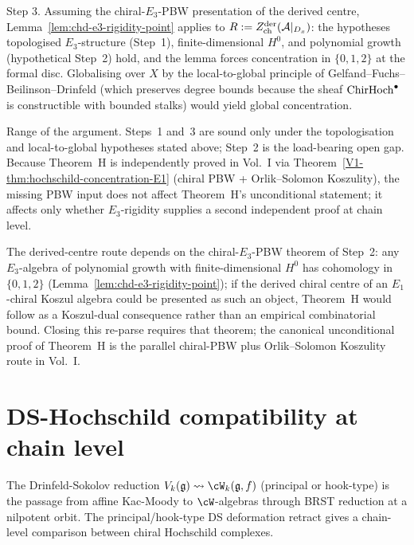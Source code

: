 \begin{remark}
Step 3. Assuming the chiral-$E_3$-PBW presentation of the derived centre,
Lemma~\ref{lem:chd-e3-rigidity-point} applies to
$R := Z^{\mathrm{der}}_{\mathrm{ch}}(\mathcal{A}|_{D_x})$: the hypotheses
topologised $E_3$-structure (Step~1), finite-dimensional $H^0$, and
polynomial growth (hypothetical Step~2) hold, and the lemma forces
concentration in $\{0,1,2\}$ at the formal disc. Globalising over $X$
by the local-to-global principle of
Gelfand--Fuchs--Beilinson--Drinfeld (which preserves degree bounds
because the sheaf $\mathrm{ChirHoch}^\bullet$ is constructible with bounded
stalks) would yield global concentration.

Range of the argument. Steps~1 and~3 are sound only under the
topologisation and local-to-global hypotheses stated above; Step~2 is
the load-bearing open gap. Because Theorem~H
is independently proved in Vol.~I via
Theorem~\ref*{V1-thm:hochschild-concentration-E1} (chiral PBW +
Orlik--Solomon Koszulity), the missing PBW input does not
affect Theorem~H's unconditional statement; it affects only whether
$E_3$-rigidity supplies a second independent proof at chain level.
\end{remark}

\begin{remark}%
\label{rem:chd-consequence-not-hypothesis}%
%
The derived-centre route depends on the chiral-$E_3$-PBW theorem
of Step~2: any $E_3$-algebra of polynomial growth with finite-dimensional
$H^0$ has cohomology in $\{0,1,2\}$
(Lemma~\ref{lem:chd-e3-rigidity-point}); if the derived chiral centre
of an $E_1$-chiral Koszul algebra could be presented as such an object,
Theorem~H would follow as a Koszul-dual consequence rather than an
empirical combinatorial bound. Closing this re-parse requires that
theorem; the canonical unconditional proof of Theorem~H is
the parallel chiral-PBW plus Orlik--Solomon Koszulity route in
Vol.~I.
\end{remark}

\section{DS-Hochschild compatibility at chain level}
\label{sec:chd-ds}

The Drinfeld-Sokolov reduction $V_k(\fg) \rightsquigarrow \cW_k(\fg, f)$
(principal or hook-type) is the passage from affine Kac-Moody to
$\cW$-algebras through BRST reduction at a nilpotent orbit. The
principal/hook-type DS deformation retract gives a chain-level
comparison between chiral Hochschild complexes.

